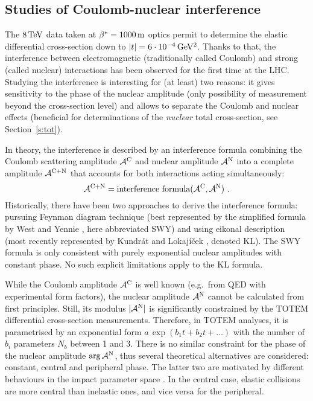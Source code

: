 \documentclass{desyproc}
\def\un#1{\,{\rm #1}}
\begin{document}
\subsection{Studies of Coulomb-nuclear interference}

The $8\un{TeV}$ data taken at $\beta^* = 1000\un{m}$ optics permit to determine the elastic differential cross-section down to $|t| = 6\cdot10^{-4}\un{GeV^2}$. Thanks to that, the interference between electromagnetic (traditionally called Coulomb) and strong (called nuclear) interactions has been observed for the first time at the LHC. Studying the interference is interesting for (at least) two reasons: it gives sensitivity to the phase of the nuclear amplitude (only possibility of measurement beyond the cross-section level) and allows to separate the Coulomb and nuclear effects (beneficial for determinations of the {\em nuclear} total cross-section, see Section~\ref{s:tot}).

In theory, the interference is described by an interference formula combining the Coulomb scattering amplitude ${\cal A}^{\rm C}$ and nuclear amplitude ${\cal A}^{\rm N}$ into a complete amplitude ${\cal A}^{\rm C+N}$ that accounts for both interactions acting simultaneously:
\begin{equation}\label{eq:int f}
{\cal A}^{\rm C+N} = \hbox{interference formula}({\cal A}^{\rm C}, {\cal A}^{\rm N})\ .
\end{equation}
Historically, there have been two approaches to derive the interference formula: pursuing Feynman diagram technique (best represented by the simplified formula by West and Yennie \cite{wy68}, here abbreviated SWY) and using eikonal description (most recently represented by Kundr\' at and Lokaj\' i\v cek \cite{kl94}, denoted KL). The SWY formula is only consistent with purely exponential nuclear amplitudes with constant phase. No such explicit limitations apply to the KL formula.

While the Coulomb amplitude ${\cal A}^{\rm C}$ is well known (e.g.~from QED with experimental form factors), the nuclear amplitude ${\cal A}^{\rm N}$ cannot be calculated from first principles. Still, its modulus $|{\cal A}^{\rm N}|$ is significantly constrained by the TOTEM differential cross-section measurements. Therefore, in TOTEM analyses, it is parametrised by an exponential form $a\,\exp(b_1 t + b_2t + \ldots)$ with the number of $b_i$ parameters $N_b$ between 1 and 3. There is no similar constraint for the phase of the nuclear amplitude $\arg {\cal A}^{\rm N}$, thus several theoretical alternatives are considered: constant, central and peripheral phase. The latter two are motivated by different behaviours in the impact parameter space \cite{kl94}. In the central case, elastic collisions are more central than inelastic ones, and vice versa for the peripheral.
\end{document}
